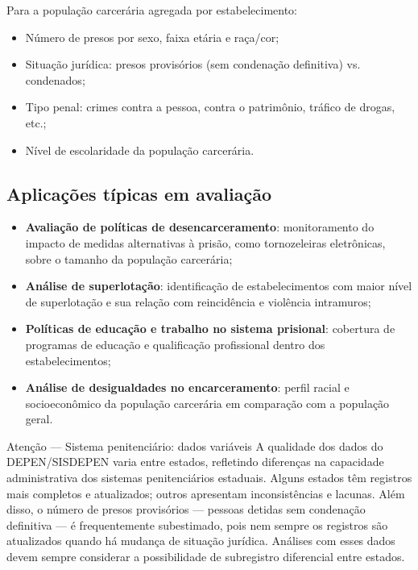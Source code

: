 Para a população carcerária agregada por estabelecimento:
\begin{itemize}
  \item Número de presos por sexo, faixa etária e raça/cor;
  \item Situação jurídica: presos provisórios (sem condenação definitiva) vs. condenados;
  \item Tipo penal: crimes contra a pessoa, contra o patrimônio, tráfico de drogas, etc.;
  \item Nível de escolaridade da população carcerária.
\end{itemize}

\subsection{Aplicações típicas em avaliação}

\begin{itemize}
  \item \textbf{Avaliação de políticas de desencarceramento}: monitoramento do impacto de medidas alternativas à prisão, como tornozeleiras eletrônicas, sobre o tamanho da população carcerária;
  \item \textbf{Análise de superlotação}: identificação de estabelecimentos com maior nível de superlotação e sua relação com reincidência e violência intramuros;
  \item \textbf{Políticas de educação e trabalho no sistema prisional}: cobertura de programas de educação e qualificação profissional dentro dos estabelecimentos;
  \item \textbf{Análise de desigualdades no encarceramento}: perfil racial e socioeconômico da população carcerária em comparação com a população geral.
\end{itemize}

\begin{boxatencao}{Atenção --- Sistema penitenciário: dados variáveis}
A qualidade dos dados do DEPEN/SISDEPEN varia entre estados, refletindo diferenças na capacidade administrativa dos sistemas penitenciários estaduais. Alguns estados têm registros mais completos e atualizados; outros apresentam inconsistências e lacunas. Além disso, o número de presos provisórios --- pessoas detidas sem condenação definitiva --- é frequentemente subestimado, pois nem sempre os registros são atualizados quando há mudança de situação jurídica. Análises com esses dados devem sempre considerar a possibilidade de subregistro diferencial entre estados.
\end{boxatencao}

